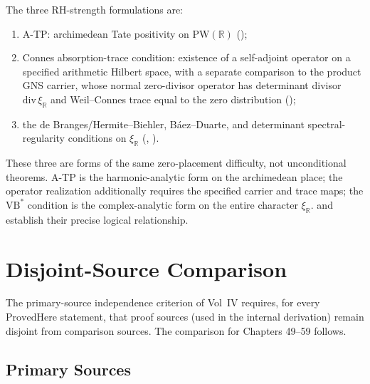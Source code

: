 \begin{remark}
\label{v4-arith:w5-synth:rem:ATP-equivalences}
The three RH-strength formulations are:
\begin{enumerate}
\item A-TP: archimedean Tate positivity on
\(\mathrm{PW}(\mathbb{R})\)
();
\item Connes absorption-trace condition: existence of a
self-adjoint operator on a specified arithmetic Hilbert space,
with a separate comparison to the product GNS carrier,
whose normal zero-divisor operator has determinant divisor
\(\mathrm{div}\,\xi_{\mathbb R}\) and Weil--Connes trace equal to the
zero distribution
();
\item the de Branges/Hermite--Biehler, B\'aez--Duarte, and
determinant spectral-regularity conditions on \(\xi_{\mathbb{R}}\)
(,
).
\end{enumerate}
These three are forms of the same zero-placement difficulty,
not unconditional theorems.
A-TP is the harmonic-analytic form on the archimedean place; the
operator realization additionally requires the specified carrier and
trace maps; the \(\mathrm{VB}^{*}\) condition is the complex-analytic form on
the entire character \(\xi_{\mathbb{R}}\).
 and
establish their precise logical relationship.
\end{remark}

\section{Disjoint-Source Comparison}
\label{v4-arith:w5-synth:disjoint-comparison}

The primary-source independence criterion of Vol~IV requires, for every
\(\mathrm{ProvedHere}\) statement, that proof sources (used
in the internal derivation) remain disjoint from
comparison sources. The comparison for Chapters 49--59 follows.

\subsection{Primary Sources}
\label{v4-arith:w5-synth:lists}

